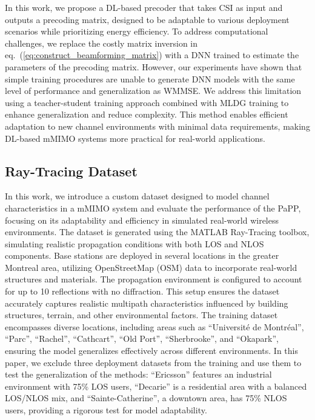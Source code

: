 In this work, we propose a \gls{DL}-based precoder that takes \gls{CSI} as input and outputs a precoding matrix, designed to be adaptable to various deployment scenarios while prioritizing energy efficiency. 
To address computational challenges, we replace the costly matrix inversion in eq.~(\ref{eq:construct_beamforming_matrix}) with a \gls{DNN} trained to estimate the parameters of the precoding matrix. 
However, our experiments have shown that simple training procedures are unable to generate DNN models with the same level of performance and generalization as \gls{WMMSE}.
We address this limitation using a teacher-student training approach combined with \gls{MLDG} training to enhance generalization and reduce complexity.
This method enables efficient adaptation to new channel environments with minimal data requirements, making \gls{DL}-based \gls{mMIMO} systems more practical for real-world applications.



\subsection{Ray-Tracing Dataset}
In this work, we introduce a custom dataset designed to model channel characteristics in a \gls{mMIMO} system and evaluate the performance of the PaPP, focusing on its adaptability and efficiency in simulated real-world wireless environments. The dataset is generated using the MATLAB Ray-Tracing toolbox, simulating realistic propagation conditions with both \gls{LOS} and \gls{NLOS} components. 
Base stations are deployed in several locations in the greater Montreal area, utilizing OpenStreetMap (OSM) \cite{OpenStreetMap} data to incorporate real-world structures and materials. The propagation environment is configured to account for up to 10 reflections with no diffraction. This setup ensures the dataset accurately captures realistic multipath characteristics influenced by building structures, terrain, and other environmental factors. The training dataset encompasses diverse locations, including areas such as ``Université de Montréal'', ``Parc'', ``Rachel'', ``Cathcart'', ``Old Port'', ``Sherbrooke'', and ``Okapark'', ensuring the model generalizes effectively across different environments. In this paper, we exclude three deployment datasets from the training and use them to test the generalization of the methods: ``Ericsson'' features an industrial environment with 75\% \gls{LOS} users, ``Decarie'' is a residential area with a balanced \gls{LOS}/\gls{NLOS} mix, and ``Sainte-Catherine'', a downtown area, has 75\% \gls{NLOS} users, providing a rigorous test for model adaptability.


